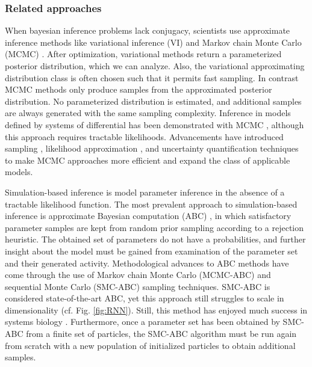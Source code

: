\documentclass[11pt]{article}
\begin{document}
 \subsubsection{Related approaches}\label{methods_related}
When bayesian inference problems lack conjugacy, scientists use approximate inference methods like variational inference (VI) \cite{saul1998mean} and Markov chain Monte Carlo (MCMC) \cite{metropolis1953equation, hastings1970monte}. 
After optimization, variational methods return a parameterized posterior distribution, which we can analyze.
Also, the variational approximating distribution class is often chosen such that it permits fast sampling.
In contrast MCMC methods only produce samples from the approximated posterior distribution.
No parameterized distribution is estimated, and additional samples are always generated with the same sampling complexity.
Inference in models defined by systems of differential has been demonstrated with MCMC \cite{girolami2011riemann}, although this approach requires tractable likelihoods.
Advancements have introduced sampling \cite{calderhead2011statistical}, likelihood approximation \cite{golightly2011bayesian}, and uncertainty quantification techniques \cite{chkrebtii2016bayesian} to make MCMC approaches more efficient and expand the class of applicable models.
 
Simulation-based inference \cite{cranmer2020frontier} is model parameter inference in the absence of a tractable likelihood function.
The most prevalent approach to simulation-based inference is approximate Bayesian computation (ABC) \cite{beaumont2002approximate}, in which satisfactory parameter samples are kept from random prior sampling according to a rejection heuristic.
The obtained set of parameters do not have a probabilities, and further insight about the model must be gained from examination of the parameter set and their generated activity.
Methodological advances to ABC methods have come through the use of Markov chain Monte Carlo (MCMC-ABC) \cite{marjoram2003markov} and sequential Monte Carlo (SMC-ABC) \cite{sisson2007sequential} sampling techniques.
SMC-ABC is considered state-of-the-art ABC, yet this approach still struggles to scale in dimensionality \cite{sisson2018handbook} (cf. Fig. \ref{fig:RNN}).
Still, this method has enjoyed much success in systems biology \cite{liepe2014framework}.
Furthermore, once a parameter set has been obtained by SMC-ABC from a finite set of particles, the SMC-ABC algorithm must be run again from scratch with a new population of initialized particles to obtain additional samples.
\end{document}
